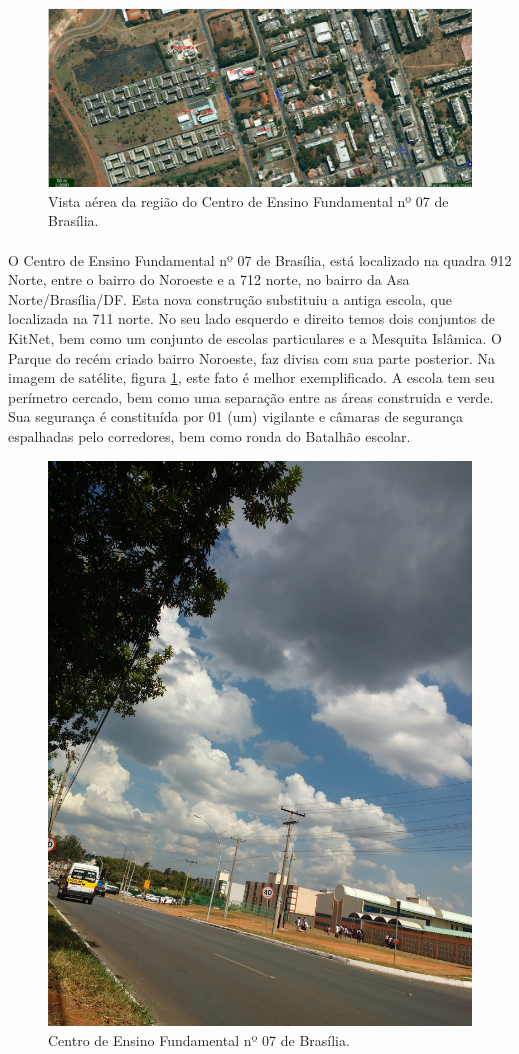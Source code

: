 \hspace{1.5cm}
\FloatBarrier
\begin{figure}[!htpb]
        \centering
        \includegraphics[width=1\textwidth]{imagens/CEF07Bsb.png}
        \caption{Vista aérea da região do Centro de Ensino Fundamental nº 07 de Brasília.}
        \label{figura01}
\end{figure}
\FloatBarrier

\paragraph{}O Centro de Ensino Fundamental nº 07 de Brasília, está localizado na quadra 912 Norte, entre o bairro do Noroeste e a 712 norte, no bairro da Asa Norte/Brasília/DF. Esta nova construção substituiu a antiga escola, que localizada na 711 norte. No seu lado esquerdo e direito temos dois conjuntos de KitNet, bem como um conjunto de escolas particulares e a Mesquita Islâmica. O Parque do recém criado bairro Noroeste, faz divisa com sua parte posterior. Na imagem de satélite, figura \ref{figura01}, este fato é melhor exemplificado. A escola tem seu perímetro cercado, bem como uma separação entre as áreas construida e verde. Sua segurança é constituída por 01 (um) vigilante e câmaras de segurança espalhadas pelo corredores, bem como ronda do Batalhão escolar.
\begin{figure}[!htpb]
        \centering
        \includegraphics[width=.7\textwidth, height=.3\textheight]{imagens/13-01-07_10-06-2016.jpg}
        \caption{Centro de Ensino Fundamental nº 07 de Brasília.}
        \label{figura02}
\end{figure}
